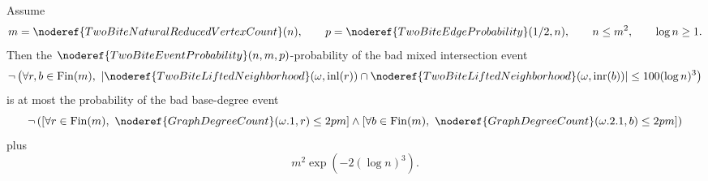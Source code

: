\begin{helper}[FiberAndDegreeMixedLiftedIntersectionUnionBound]
\label{helper:FiberAndDegreeMixedLiftedIntersectionUnionBound}
Assume
\[
m=\noderef{TwoBiteNaturalReducedVertexCount}(n),\qquad
p=\noderef{TwoBiteEdgeProbability}(1/2,n),\qquad
n\le m^2,\qquad \log n\ge1.
\]
Then the
\(\noderef{TwoBiteEventProbability}(n,m,p)\)-probability of the bad mixed
intersection event
\[
\neg\left(
\forall r,b\in\operatorname{Fin}(m),\
\left|
\noderef{TwoBiteLiftedNeighborhood}(\omega,\operatorname{inl}(r))
\cap
\noderef{TwoBiteLiftedNeighborhood}(\omega,\operatorname{inr}(b))
\right|
\le 100(\log n)^3
\right)
\]
is at most the probability of the bad base-degree event
\[
\neg\left(
\left[\forall r\in\operatorname{Fin}(m),\
\noderef{GraphDegreeCount}(\omega.1,r)\le2pm\right]
\wedge
\left[\forall b\in\operatorname{Fin}(m),\
\noderef{GraphDegreeCount}(\omega.2.1,b)\le2pm\right]
\right)
\]
plus
\[
m^2\exp(-2(\log n)^3).
\]
\end{helper}

